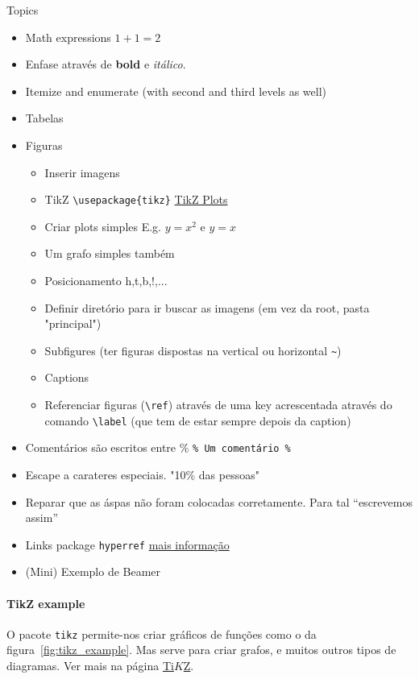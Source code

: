 \documentclass[10pt]{article}
\begin{document}
Topics
\begin{itemize}
    \item Math expressions $ 1 + 1 = 2$
    \item Enfase através de \textbf{bold} e \emph{itálico}. %
    \item Itemize and enumerate (with second and third levels as well)
    \item Tabelas
    \item Figuras
    \begin{itemize}
        \item Inserir imagens
        \item TikZ \verb|\usepackage{tikz}| \href{https://tikz.dev/tikz-plots}{TikZ Plots}
            \item Criar plots simples E.g. $y=x^{2}$ e $y=x$
            \item Um grafo simples também
        \item Posicionamento h,t,b,!,...
        \item Definir diretório para ir buscar as imagens (em vez da root, pasta "principal")
        \item Subfigures (ter figuras dispostas na vertical ou horizontal \verb|~|)
        \item Captions
        \item Referenciar figuras (\verb|\ref|) através de uma key acrescentada através do comando \verb|\label| (que tem de estar sempre depois da caption)
    \end{itemize}
    \item Comentários são escritos entre \% \verb|% Um comentário %| %
    \item Escape a carateres especiais. "10\% das pessoas"
    \item Reparar que as áspas não foram colocadas corretamente. Para tal ``escrevemos assim''
    \item Links package \verb|hyperref| \href{https://en.wikibooks.org/wiki/LaTeX/Hyperlinks}{mais informação}
    \item (Mini) Exemplo de Beamer
\end{itemize}


\paragraph*{TikZ example} O pacote \verb|tikz| permite-nos criar gráficos de funções como o da figura~\ref{fig:tikz_example}. Mas serve para criar grafos, e muitos outros tipos de diagramas.
Ver mais na página \href{https://tikz.dev/}{Ti$K$Z}.
\end{document}
